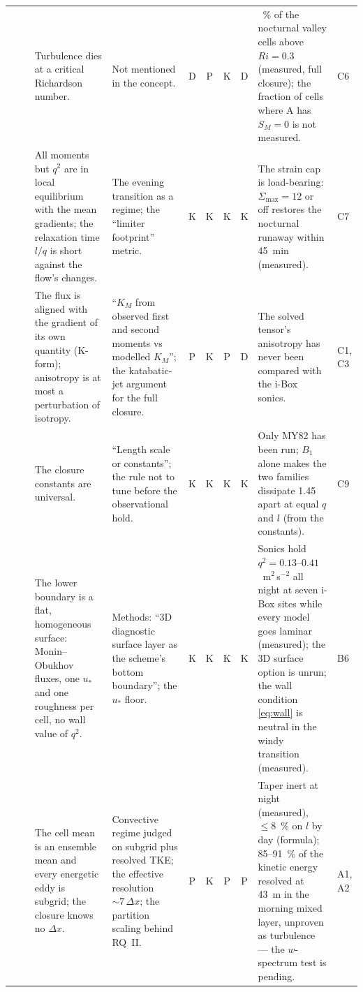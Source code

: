 \documentclass[10pt,a4paper]{article}
\newcommand{\keytag}[1]{\colorbox{keyc}{\textcolor{white}{\sffamily\bfseries\scriptsize K#1}}}
\begin{document}
\begin{table}[!t]
\begin{tabularx}{\textwidth}{@{}l >{\raggedright\arraybackslash}p{3.9cm} >{\raggedright\arraybackslash}X c@{\,}c@{\,}c@{\,}c >{\raggedright\arraybackslash}X l@{}}
\addlinespace[2pt]
\keytag{4} & Turbulence dies at a critical Richardson number. & Not mentioned in the concept. & D & P & K & D & 69~\% of the nocturnal valley cells above $Ri = 0.3$ (measured, full closure); the fraction of cells where A has $S_M = 0$ is not measured. & C6 \\
\addlinespace[2pt]
\keytag{5} & All moments but $q^2$ are in local equilibrium with the mean gradients; the relaxation time $l/q$ is short against the flow's changes. & The evening transition as a regime; the ``limiter footprint'' metric. & K & K & K & K & The strain cap is load-bearing: $\Sigma_{\max} = 12$ or off restores the nocturnal runaway within 45~min (measured). & C7 \\
\addlinespace[2pt]
\keytag{6} & The flux is aligned with the gradient of its own quantity (K-form); anisotropy is at most a perturbation of isotropy. & ``$K_M$ from observed first and second moments vs modelled $K_M$''; the katabatic-jet argument for the full closure. & P & K & P & D & The solved tensor's anisotropy has never been compared with the i-Box sonics. & C1, C3 \\
\addlinespace[2pt]
\keytag{7} & The closure constants are universal. & ``Length scale or constants''; the rule not to tune before the observational hold. & K & K & K & K & Only MY82 has been run; $B_1$ alone makes the two families dissipate 1.45 apart at equal $q$ and $l$ (from the constants). & C9 \\
\addlinespace[2pt]
\keytag{8} & The lower boundary is a flat, homogeneous surface: Monin--Obukhov fluxes, one $u_*$ and one roughness per cell, no wall value of $q^2$. & Methods: ``3D diagnostic surface layer as the scheme's bottom boundary''; the $u_*$ floor. & K & K & K & K & Sonics hold $q^2 = 0.13$--$0.41$~m$^2$\,s$^{-2}$ all night at seven i-Box sites while every model goes laminar (measured); the 3D surface option is unrun; the wall condition \eqref{eq:wall} is neutral in the windy transition (measured). & B6 \\
\addlinespace[2pt]
\keytag{9} & The cell mean is an ensemble mean and every energetic eddy is subgrid; the closure knows no $\Delta x$. & Convective regime judged on subgrid plus resolved TKE; the effective resolution $\sim 7\,\Delta x$; the partition scaling behind RQ~II. & P & K & P & P & Taper inert at night (measured), $\le 8$~\% on $l$ by day (formula); 85--91~\% of the kinetic energy resolved at 43~m in the morning mixed layer, unproven as turbulence — the $w$-spectrum test is pending. & A1, A2 \\
\bottomrule
\end{tabularx}
\end{table}
\end{document}
